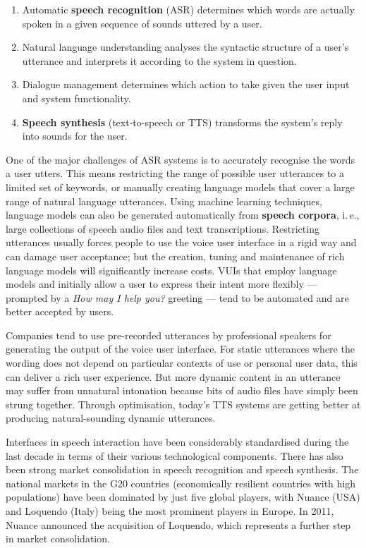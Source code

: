\documentclass[]{../../metanetpaper}
\begin{document}
\begin{multicols}{2}
\begin{enumerate}
\item Automatic \textbf{speech recognition} (ASR) determines which words are actually spoken in a given sequence of sounds uttered by a user.
\item Natural language understanding analyses the syntactic structure of a user’s utterance and interprets it according to the system in question.
\item Dialogue management determines which action to take given the user input and system functionality.
\item \textbf{Speech synthesis} (text-to-speech or TTS) transforms the system’s reply into sounds for the user.
\end{enumerate}

One of the major challenges of ASR systems is to accurately recognise the words a user utters. This means restricting the range of possible user utterances to a limited set of keywords, or manually creating language models that cover a large range of natural language utterances. Using machine learning techniques, language models can also be generated automatically from \textbf{speech corpora}, i.\,e., large collections of speech audio files and text transcriptions. Restricting utterances usually forces people to use the voice user interface in a rigid way and can damage user acceptance; but the creation, tuning and maintenance of rich language models will significantly increase costs. VUIs that employ language models and initially allow a user to express their intent more flexibly — prompted by a \textit{How may I help you?} greeting — tend to be automated and are better accepted by users.


Companies tend to use pre-recorded utterances by professional speakers for generating the output of the voice user interface. For static utterances where the wording does not depend on particular contexts of use or personal user data, this can deliver a rich user experience. But more dynamic content in an utterance may suffer from unnatural intonation because bits of audio files have simply been strung together. Through optimisation, today’s TTS systems are getting better at producing natural-sounding dynamic utterances.

Interfaces in speech interaction have been considerably standardised during the last decade in terms of their various technological components. There has also been strong market consolidation in speech recognition and speech synthesis. The national markets in the G20 countries (economically resilient countries with high populations) have been dominated by just five global players, with Nuance (USA) and Loquendo (Italy) being the most prominent players in Europe. In 2011, Nuance announced the acquisition of Loquendo, which represents a further step in market consolidation.


\end{multicols}
\end{document}
